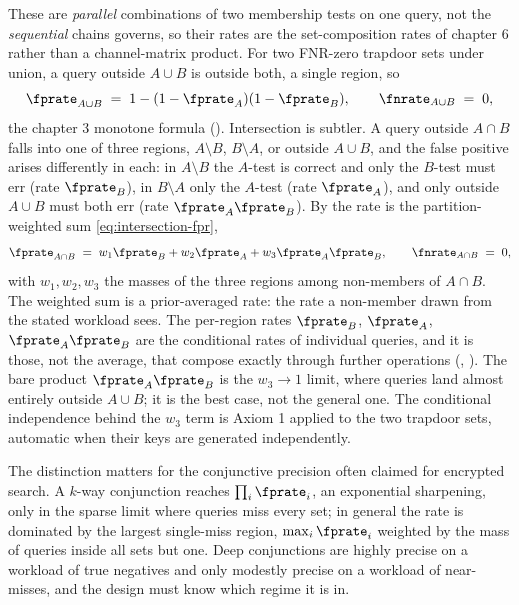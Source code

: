 These are \emph{parallel} combinations of two membership tests on one
query, not the \emph{sequential} chains 
governs, so their rates are the set-composition rates of chapter 6 rather
than a channel-matrix product. For two FNR-zero trapdoor sets under
union, a query outside $A \cup B$ is outside both, a single region, so
\[
  \fprate_{A \cup B} \;=\; 1 - (1 - \fprate_A)(1 - \fprate_B),
  \qquad
  \fnrate_{A \cup B} \;=\; 0,
\]
the chapter 3 monotone formula (). Intersection is
subtler. A query outside $A \cap B$ falls into one of three regions, $A
\setminus B$, $B \setminus A$, or outside $A \cup B$, and the false
positive arises differently in each: in $A \setminus B$ the $A$-test is
correct and only the $B$-test must err (rate $\fprate_B$), in $B \setminus
A$ only the $A$-test (rate $\fprate_A$), and only outside $A \cup B$ must
both err (rate $\fprate_A \fprate_B$). By 
the rate is the partition-weighted sum \eqref{eq:intersection-fpr},
\[
  \fprate_{A \cap B} \;=\; w_1 \fprate_B + w_2 \fprate_A
  + w_3 \fprate_A \fprate_B,
  \qquad
  \fnrate_{A \cap B} \;=\; 0,
\]
with $w_1, w_2, w_3$ the masses of the three regions among non-members of
$A \cap B$. The weighted sum is a prior-averaged rate: the
rate a non-member drawn from the stated workload sees. The per-region
rates $\fprate_B$, $\fprate_A$, $\fprate_A \fprate_B$ are the conditional
rates of individual queries, and it is those, not the average, that
compose exactly through further operations
(, ). The bare product $\fprate_A \fprate_B$ is the $w_3 \to 1$
limit, where queries land almost entirely outside $A \cup B$; it is the
best case, not the general one. The conditional independence behind the
$w_3$ term is Axiom 1 applied to the two trapdoor sets, automatic when
their keys are generated independently.

The distinction matters for the conjunctive precision often claimed for
encrypted search. A $k$-way conjunction reaches $\prod_i \fprate_i$, an
exponential sharpening, only in the sparse limit where queries miss every
set; in general the rate is dominated by the largest single-miss region,
$\max_i \fprate_i$ weighted by the mass of queries inside all sets but
one. Deep conjunctions are highly precise on a workload of true negatives
and only modestly precise on a workload of near-misses, and the design
must know which regime it is in.

